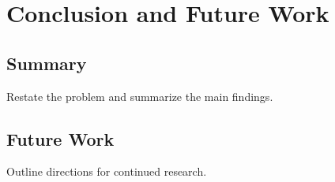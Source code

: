 \chapter{Conclusion and Future Work}
\label{ch:conclusion}

\section{Summary}
\label{sec:concl-summary}

Restate the problem and summarize the main findings.

\section{Future Work}
\label{sec:concl-future}

Outline directions for continued research.
